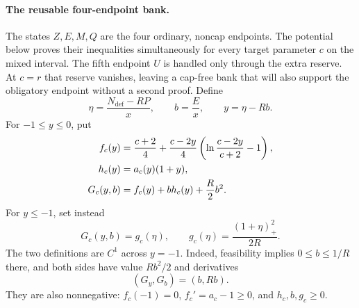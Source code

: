 \paragraph{The reusable four-endpoint bank.}
The states $Z,E,M,Q$ are the four ordinary, noncap endpoints.  The potential
below proves their inequalities simultaneously for every target parameter
$c$ on the mixed interval.  The fifth endpoint $U$ is handled only through
the extra reserve.  At $c=r$ that reserve vanishes, leaving a cap-free bank
that will also support the obligatory endpoint without a second proof.
Define
\begin{equation}
 \eta=\frac{N_{\mathrm{def}}-RP}{x},
 \qquad b=\frac Ex,
 \qquad y=\eta-Rb.
 \label{eq:opt:eta-b}
\end{equation}
For $-1\le y\le0$, put
\begin{align}
 f_c(y)
 &=\frac{c+2}{4}
   +\frac{c-2y}{4}
      \left(\ln\frac{c-2y}{c+2}-1\right),
 \label{eq:opt:f-definition}\\
 h_c(y)&=a_c(y)(1+y),
 \notag\\
 G_c(y,b)&=f_c(y)+b h_c(y)+\frac R2b^2.
 \label{eq:opt:G-region-one}
\end{align}
For $y\le-1$, set instead
\begin{equation}
 G_c(y,b)=g_c(\eta),
 \qquad
 g_c(\eta)=\frac{(1+\eta)_+^2}{2R}.
 \label{eq:opt:G-region-two}
\end{equation}
The two definitions are $C^1$ across $y=-1$.  Indeed, feasibility
implies $0\le b\le1/R$ there, and both sides have value $Rb^2/2$ and
derivatives
\[
 (G_y,G_b)=(b,Rb).
\]
They are also nonnegative: $f_c(-1)=0$,
$f_c'=a_c-1\ge0$, and $h_c,b,g_c\ge0$.

